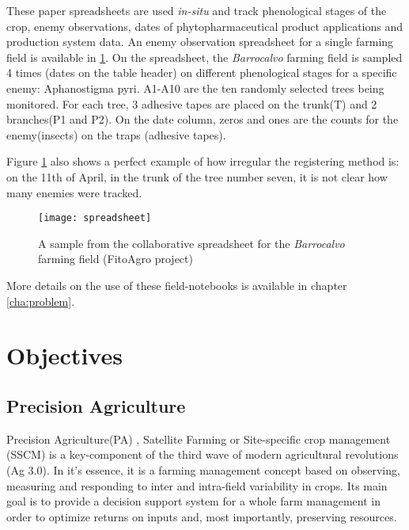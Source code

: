 These paper spreadsheets are used \emph{in-situ} and track phenological stages of the crop, enemy observations, dates of phytopharmaceutical product applications and production system data. An enemy observation spreadsheet for a single farming field is available in \ref{fig:spreadsheet}. On the spreadsheet, the \textit{Barrocalvo} farming field is sampled 4 times (dates on the table header) on different phenological stages for a specific enemy: Aphanostigma pyri. A1-A10 are the ten randomly selected trees being monitored. For each tree, 3 adhesive tapes are placed on the trunk(T) and 2 branches(P1 and P2). On the date column, zeros and ones are the counts for the enemy(insects) on the traps (adhesive tapes). 

Figure \ref{fig:spreadsheet} also shows a perfect example of how irregular the registering method is: on the 11th of April, in the trunk of the tree number seven, it is not clear how many enemies were tracked.

\begin{figure}[htbp]
  \centering
  \texttt{[image: spreadsheet]}
  \caption{A sample from the collaborative spreadsheet for the \textit{Barrocalvo} farming field (FitoAgro project)}
  \label{fig:spreadsheet}
\end{figure}

More details on the use of these field-notebooks is available in chapter \ref{cha:problem}.

\section{Objectives} %
\label{sec:objective}

\subsection{Precision Agriculture}
\label{sec:precision_agriculture}

Precision Agriculture(PA) , Satellite Farming or Site-specific crop management (SSCM) is a key-component  of the third wave of modern agricultural revolutions (Ag 3.0). In it's essence, it is a farming management concept based on observing, measuring and responding to inter and intra-field variability in crops. Its main goal is to provide a decision support system for a whole farm management in order to optimize returns on inputs and, most importantly, preserving resources.

